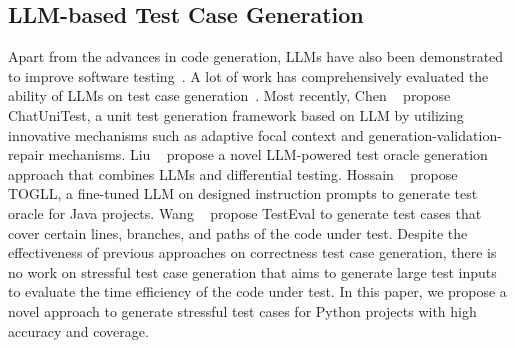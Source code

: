 \subsection{LLM-based Test Case Generation}
Apart from the advances in code generation, LLMs have also been demonstrated to improve software testing~\cite{deng23large}. A lot of work has comprehensively evaluated the ability of LLMs on test case generation~\cite{li24large,ouédraogo24large,sami24a,karanjai24harnessing,niels24code}. Most recently, Chen \etal~\cite{chen24chatunitest} propose ChatUniTest, a unit test generation framework
based on LLM by utilizing innovative mechanisms such
as adaptive focal context and generation-validation-repair mechanisms. Liu \etal~\cite{liu24llm} propose a novel LLM-powered test oracle generation approach that combines LLMs and differential testing. Hossain \etal~\cite{hossain24togll} propose TOGLL, a fine-tuned LLM on designed instruction prompts to generate test oracle for Java projects. Wang \etal~\cite{wang24testeval} propose TestEval to generate test cases that cover certain lines, branches, and paths of the code under test. Despite the effectiveness of previous approaches on correctness test case generation, there is no work on stressful test case generation that aims to generate large test inputs to evaluate the time efficiency of the code under test. In this paper, we propose a novel approach \tool to generate stressful test cases for Python projects with high accuracy and coverage.